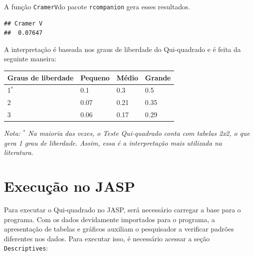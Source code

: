 \documentclass[
]{book}
\newenvironment{Shaded}{\begin{snugshade}}{\end{snugshade}}
\newcommand{\KeywordTok}[1]{\textcolor[rgb]{0.13,0.29,0.53}{\textbf{#1}}}
\newcommand{\NormalTok}[1]{#1}
\newcommand{\OperatorTok}[1]{\textcolor[rgb]{0.81,0.36,0.00}{\textbf{#1}}}
\begin{document}
A função \texttt{CramerV}do pacote \texttt{rcompanion} gera esses
resultados.

\begin{Shaded}
\end{Shaded}

\begin{verbatim}
## Cramer V 
##  0.07647
\end{verbatim}

A interpretação é baseada nos graus de liberdade do Qui-quadrado e é
feita da seguinte maneira:

\begin{longtable}[]{@{}llll@{}}
\toprule
Graus de liberdade & Pequeno & Médio & Grande\tabularnewline
\midrule
\endhead
1\(^*\) & 0.1 & 0.3 & 0.5\tabularnewline
2 & 0.07 & 0.21 & 0.35\tabularnewline
3 & 0.06 & 0.17 & 0.29\tabularnewline
\bottomrule
\end{longtable}

\emph{Nota: \(^*\) Na maioria das vezes, o Teste Qui-quadrado conta com
tabelas 2x2, o que gera 1 grau de liberdade. Assim, essa é a
interpretação mais utilizada na literatura.}

\hypertarget{execuuxe7uxe3o-no-jasp-1}{%
\section{Execução no JASP}\label{execuuxe7uxe3o-no-jasp-1}}

Para executar o Qui-quadrado no JASP, será necessário carregar a base
para o programa. Com os dados devidamente importados para o programa, a
apresentação de tabelas e gráficos auxiliam o pesquisador a verificar
padrões diferentes nos dados. Para executar isso, é necessário acessar a
seção \texttt{Descriptives}:
\end{document}
